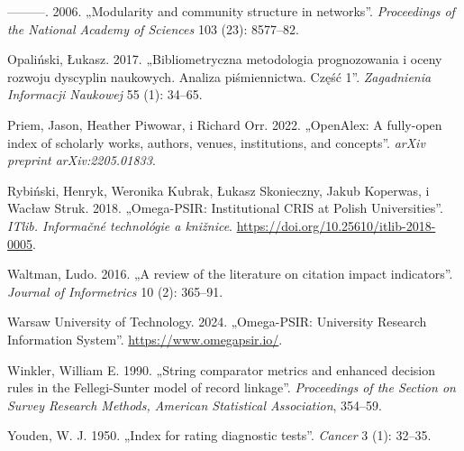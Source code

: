 \documentclass[
  polish,
  12pt,
  a4paper,
]{article}
\newlength{\cslhangindent}
\newenvironment{CSLReferences}[2] %
 {\begin{list}{}{%
  \setlength{\itemindent}{0pt}
  \setlength{\leftmargin}{0pt}
  \setlength{\parsep}{0pt}
  \ifodd #1
   \setlength{\leftmargin}{\cslhangindent}
   \setlength{\itemindent}{-1\cslhangindent}
  \fi
  \setlength{\itemsep}{#2\baselineskip}}}
 {\end{list}}
\begin{document}
\begin{CSLReferences}{1}{0}
---------. 2006. {„Modularity and community structure in networks''}.
\emph{Proceedings of the National Academy of Sciences} 103 (23):
8577--82.

Opaliński, Łukasz. 2017. {„Bibliometryczna metodologia prognozowania i
oceny rozwoju dyscyplin naukowych. Analiza piśmiennictwa. Część 1''}.
\emph{Zagadnienia Informacji Naukowej} 55 (1): 34--65.

Priem, Jason, Heather Piwowar, i Richard Orr. 2022. {„OpenAlex: A
fully-open index of scholarly works, authors, venues, institutions, and
concepts''}. \emph{arXiv preprint arXiv:2205.01833}.

Rybiński, Henryk, Weronika Kubrak, Łukasz Skonieczny, Jakub Koperwas, i
Wacław Struk. 2018. {„Omega-{PSIR}: {Institutional CRIS} at {Polish
Universities}''}. \emph{ITlib. Informačné technológie a knižnice}.
\url{https://doi.org/10.25610/itlib-2018-0005}.

Waltman, Ludo. 2016. {„A review of the literature on citation impact
indicators''}. \emph{Journal of Informetrics} 10 (2): 365--91.

Warsaw University of Technology. 2024. {„Omega-PSIR: University Research
Information System''}. \url{https://www.omegapsir.io/}.

Winkler, William E. 1990. {„String comparator metrics and enhanced
decision rules in the {Fellegi-Sunter} model of record linkage''}.
\emph{Proceedings of the Section on Survey Research Methods, American
Statistical Association}, 354--59.

Youden, W. J. 1950. {„Index for rating diagnostic tests''}.
\emph{Cancer} 3 (1): 32--35.

\end{CSLReferences}
\end{document}
